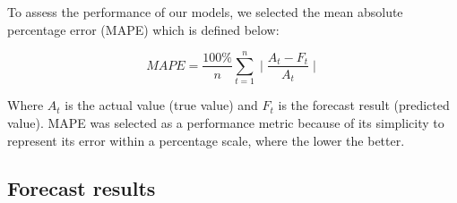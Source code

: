 To assess the performance of our models, we selected the mean absolute percentage error (MAPE) which is defined below:

\[ MAPE= \frac{100\%}{n} \sum_{t=1}^n \mid \frac{A_t - F_t}{A_t} \mid  \]

Where $A_t$ is the actual value (true value) and $F_t$ is the forecast result (predicted value). MAPE was selected as a performance metric because of its simplicity to represent its error within a percentage scale, where the lower the better. 

\subsection[Forecast results]{Forecast results}
\label{sec:results}


